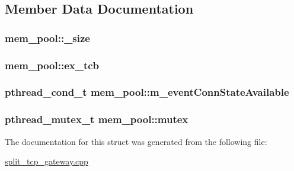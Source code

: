 \subsection{\-Member \-Data \-Documentation}
\hypertarget{structmem__pool_a8845fb60be546e04b56d71ebbbcfe0ce}{
\subsubsection[{\-\_\-size}]{ {\bf mem\-\_\-pool\-::\-\_\-size}}}\label{structmem__pool_a8845fb60be546e04b56d71ebbbcfe0ce}
\hypertarget{structmem__pool_a85dd96771d2c5329aa4e2b64cee68b0f}{
\subsubsection[{ex\-\_\-tcb}]{ {\bf mem\-\_\-pool\-::ex\-\_\-tcb}}}\label{structmem__pool_a85dd96771d2c5329aa4e2b64cee68b0f}
\hypertarget{structmem__pool_aff39f70481fdcbb29a2b58e7ffb27acf}{
\subsubsection[{m\-\_\-event\-Conn\-State\-Available}]{\setlength{\rightskip}{0pt plus 5cm}pthread\-\_\-cond\-\_\-t {\bf mem\-\_\-pool\-::m\-\_\-event\-Conn\-State\-Available}}}\label{structmem__pool_aff39f70481fdcbb29a2b58e7ffb27acf}
\hypertarget{structmem__pool_a06fca3bdc7d0942a3ea77ad02de743ad}{
\subsubsection[{mutex}]{\setlength{\rightskip}{0pt plus 5cm}pthread\-\_\-mutex\-\_\-t {\bf mem\-\_\-pool\-::mutex}}}\label{structmem__pool_a06fca3bdc7d0942a3ea77ad02de743ad}


\-The documentation for this struct was generated from the following file\-:\begin{DoxyCompactItemize}
\item 
\hyperlink{split__tcp__gateway_8cpp}{split\-\_\-tcp\-\_\-gateway.\-cpp}\end{DoxyCompactItemize}

